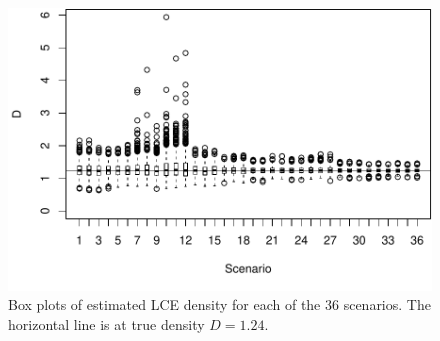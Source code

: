 \documentclass[useAMS, usenatbib, referee]{biom}\usepackage[]{graphicx}\usepackage[]{color}
\makeatletter
\def\maxwidth{ %
  \ifdim\Gin@nat@width>\linewidth
    \linewidth
  \else
    \Gin@nat@width
  \fi
}
\newenvironment{knitrout}{}{} %
\makeatother
\begin{document}

\begin{knitrout}
\color{fgcolor}\begin{figure}

{\centering \includegraphics[width=\maxwidth]{figs/fig_boxplots_bcs-1} 

}

\caption[Box plots of estimated LCE density for each of the 36 scenarios]{Box plots of estimated LCE density for each of the 36 scenarios. The horizontal line is at true density \(D=1.24\). }\label{fig:fig_boxplots_bcs}
\end{figure}


\end{knitrout}
\end{document}
